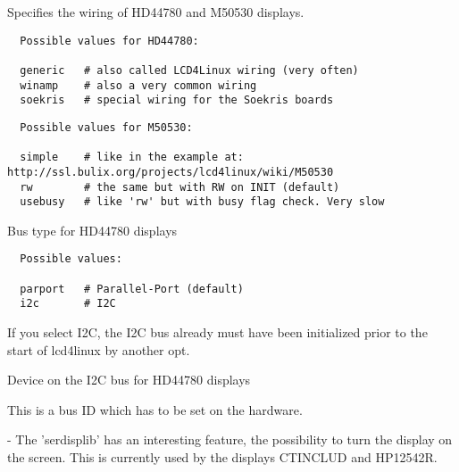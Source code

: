 \begin{description}

  Specifies the wiring of HD44780 and M50530 displays.

\begin{example}
\begin{verbatim}
  Possible values for HD44780:

  generic	# also called LCD4Linux wiring (very often)
  winamp	# also a very common wiring
  soekris	# special wiring for the Soekris boards
\end{verbatim}
\end{example}

\begin{example}
\begin{verbatim}
  Possible values for M50530:

  simple	# like in the example at: http://ssl.bulix.org/projects/lcd4linux/wiki/M50530
  rw		# the same but with RW on INIT (default)
  usebusy	# like 'rw' but with busy flag check. Very slow
\end{verbatim}
\end{example}


  Bus type for HD44780 displays
  
\begin{example}
\begin{verbatim}
  Possible values:

  parport	# Parallel-Port (default)
  i2c		# I2C
\end{verbatim}
\end{example}

If you select I2C, the I2C bus already must have been initialized prior to the start of lcd4linux by another opt.


  Device on the I2C bus for HD44780 displays

  This is a bus ID which has to be set on the hardware.


- The 'serdisplib' has an interesting feature, the possibility
  to turn the display on the screen.
  This is currently used by the displays CTINCLUD and HP12542R.



\end{description}
